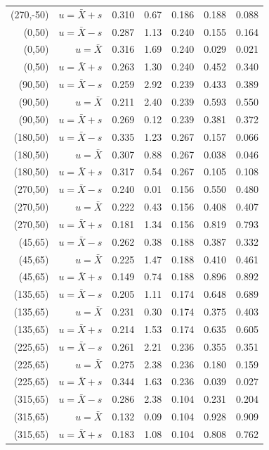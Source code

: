 \begin{tabular}{rrrrrrr}
(270,-50) & $u=\bar X+s$ & 0.310 & 0.67 & 0.186 & 0.188 & 0.088 \\
(0,50) & $u=\bar X-s$ & 0.287 & 1.13 & 0.240 & 0.155 & 0.164 \\
(0,50) & $u=\bar X$ & 0.316 & 1.69 & 0.240 & 0.029 & 0.021 \\
(0,50) & $u=\bar X+s$ & 0.263 & 1.30 & 0.240 & 0.452 & 0.340 \\
(90,50) & $u=\bar X-s$ & 0.259 & 2.92 & 0.239 & 0.433 & 0.389 \\
(90,50) & $u=\bar X$ & 0.211 & 2.40 & 0.239 & 0.593 & 0.550 \\
(90,50) & $u=\bar X+s$ & 0.269 & 0.12 & 0.239 & 0.381 & 0.372 \\
(180,50) & $u=\bar X-s$ & 0.335 & 1.23 & 0.267 & 0.157 & 0.066 \\
(180,50) & $u=\bar X$ & 0.307 & 0.88 & 0.267 & 0.038 & 0.046 \\
(180,50) & $u=\bar X+s$ & 0.317 & 0.54 & 0.267 & 0.105 & 0.108 \\
(270,50) & $u=\bar X-s$ & 0.240 & 0.01 & 0.156 & 0.550 & 0.480 \\
(270,50) & $u=\bar X$ & 0.222 & 0.43 & 0.156 & 0.408 & 0.407 \\
(270,50) & $u=\bar X+s$ & 0.181 & 1.34 & 0.156 & 0.819 & 0.793 \\
(45,65) & $u=\bar X-s$ & 0.262 & 0.38 & 0.188 & 0.387 & 0.332 \\
(45,65) & $u=\bar X$ & 0.225 & 1.47 & 0.188 & 0.410 & 0.461 \\
(45,65) & $u=\bar X+s$ & 0.149 & 0.74 & 0.188 & 0.896 & 0.892 \\
(135,65) & $u=\bar X-s$ & 0.205 & 1.11 & 0.174 & 0.648 & 0.689 \\
(135,65) & $u=\bar X$ & 0.231 & 0.30 & 0.174 & 0.375 & 0.403 \\
(135,65) & $u=\bar X+s$ & 0.214 & 1.53 & 0.174 & 0.635 & 0.605 \\
(225,65) & $u=\bar X-s$ & 0.261 & 2.21 & 0.236 & 0.355 & 0.351 \\
(225,65) & $u=\bar X$ & 0.275 & 2.38 & 0.236 & 0.180 & 0.159 \\
(225,65) & $u=\bar X+s$ & 0.344 & 1.63 & 0.236 & 0.039 & 0.027 \\
(315,65) & $u=\bar X-s$ & 0.286 & 2.38 & 0.104 & 0.231 & 0.204 \\
(315,65) & $u=\bar X$ & 0.132 & 0.09 & 0.104 & 0.928 & 0.909 \\
(315,65) & $u=\bar X+s$ & 0.183 & 1.08 & 0.104 & 0.808 & 0.762 \\
\hline
\end{tabular}
